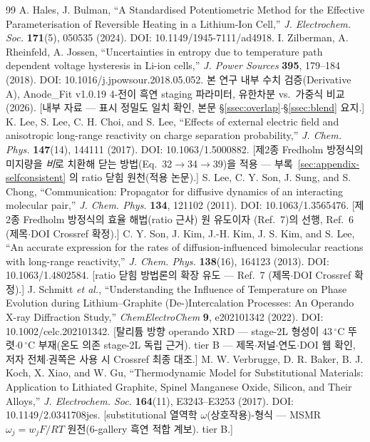 \begin{thebibliography}{99}
 A. Hales, J. Bulman, ``A Standardised Potentiometric Method for the Effective Parameterisation of Reversible Heating in a Lithium-Ion Cell,'' \emph{J. Electrochem. Soc.} \textbf{171}(5), 050535 (2024). DOI: 10.1149/1945-7111/ad4918.
 I. Zilberman, A. Rheinfeld, A. Jossen, ``Uncertainties in entropy due to temperature path dependent voltage hysteresis in Li-ion cells,'' \emph{J. Power Sources} \textbf{395}, 179--184 (2018). DOI: 10.1016/j.jpowsour.2018.05.052.
 본 연구 내부 수치 검증(Derivative A), Anode\_Fit v1.0.19 4-전이 흑연 staging 파라미터, 유한차분 vs.\ 가중식 비교 (2026). [내부 자료 --- 표시 정밀도 일치 확인, 본문 \S\ref{ssec:overlap}$\cdot$\S\ref{ssec:blend} 요지.]
 K. Lee, S. Lee, C. H. Choi, and S. Lee, ``Effects of external electric field and anisotropic long-range reactivity on charge separation probability,'' \emph{J. Chem. Phys.} \textbf{147}(14), 144111 (2017). DOI: 10.1063/1.5000882. [제2종 Fredholm 방정식의 미지량을 \emph{비}로 치환해 닫는 방법(Eq.~32$\to$34$\to$39)을 적용 --- 부록~\ref{sec:appendix-selfconsistent} 의 ratio 닫힘 원천(적용 논문).]
 S. Lee, C. Y. Son, J. Sung, and S. Chong, ``Communication: Propagator for diffusive dynamics of an interacting molecular pair,'' \emph{J. Chem. Phys.} \textbf{134}, 121102 (2011). DOI: 10.1063/1.3565476. [제2종 Fredholm 방정식의 효율 해법(ratio 근사) 원 유도이자 \cite{son2013jcp}(Ref.~7)의 선행, \cite{lee2017jcp} Ref.~6 (제목$\cdot$DOI Crossref 확정).]
 C. Y. Son, J. Kim, J.-H. Kim, J. S. Kim, and S. Lee, ``An accurate expression for the rates of diffusion-influenced bimolecular reactions with long-range reactivity,'' \emph{J. Chem. Phys.} \textbf{138}(16), 164123 (2013). DOI: 10.1063/1.4802584. [ratio 닫힘 방법론의 확장 유도 --- \cite{lee2017jcp} Ref.~7 (제목$\cdot$DOI Crossref 확정).]
 J. Schmitt \emph{et al.}, ``Understanding the Influence of Temperature on Phase Evolution during Lithium--Graphite (De-)Intercalation Processes: An Operando X-ray Diffraction Study,'' \emph{ChemElectroChem} \textbf{9}, e202101342 (2022). DOI: 10.1002/celc.202101342. [탈리튬 방향 operando XRD --- stage-2L 형성이 $43\,^\circ$C 뚜렷$\cdot$$0\,^\circ$C 부재(온도 의존 stage-2L 독립 근거). tier B --- 제목$\cdot$저널$\cdot$연도$\cdot$DOI 웹 확인, 저자 전체$\cdot$권쪽은 사용 시 Crossref 최종 대조.]
 M. W. Verbrugge, D. R. Baker, B. J. Koch, X. Xiao, and W. Gu, ``Thermodynamic Model for Substitutional Materials: Application to Lithiated Graphite, Spinel Manganese Oxide, Silicon, and Their Alloys,'' \emph{J. Electrochem. Soc.} \textbf{164}(11), E3243--E3253 (2017). DOI: 10.1149/2.0341708jes. [substitutional 열역학 $\omega$(상호작용)-형식 --- MSMR $\omega_j{=}w_jF/RT$ 원전(6-gallery 흑연 적합 계보). tier B.]
\end{thebibliography}
